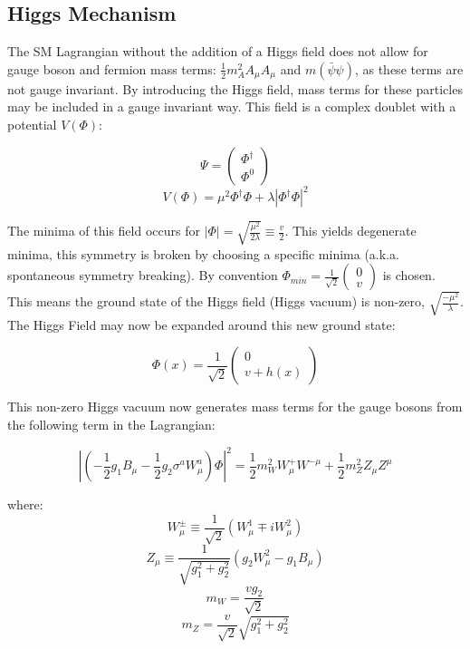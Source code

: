 \subsection{Higgs Mechanism}
The SM Lagrangian without the addition of a Higgs field does not allow for gauge boson and fermion mass terms: $\frac{1}{2}m_{A}^{2}A_{\mu}A_{\mu}$ and $m(\bar{\psi}\psi)$,  as these terms are not gauge invariant. By introducing the Higgs field, mass terms for these particles may be included in a gauge invariant way. This field is a complex doublet with a potential $V(\Phi)$:

\begin{equation}
\Psi = \begin{pmatrix} \Phi^{\dagger} \\ \Phi^{0} \end{pmatrix}
\end{equation}
\begin{equation}
V(\Phi)=\mu^{2}\Phi^{\dagger}\Phi + \lambda |\Phi^{\dagger}\Phi|^{2}
\end{equation}

The minima of this field occurs for $|\Phi|= \sqrt{\frac{\mu^{2}}{2\lambda}} \equiv \frac{v}{2}$. This yields degenerate minima, this symmetry is broken by choosing a specific minima (a.k.a. spontaneous symmetry breaking). By convention  $\Phi_{min} = \frac{1}{\sqrt{2}}\begin{pmatrix}0 \\ v \end{pmatrix}$ is chosen. This means the ground state of the Higgs field (Higgs vacuum) is non-zero, $\sqrt{\frac{-\mu^{2}}{\lambda}}$. The Higgs Field may now be expanded around this new ground state:

\begin{equation}
\Phi(x)=\frac{1}{\sqrt{2}}\begin{pmatrix} 0 \\ v+h(x)\end{pmatrix}
\end{equation}

This non-zero Higgs vacuum now generates mass terms for the gauge bosons from the following term in the Lagrangian:

\begin{equation}
|(-\frac{1}{2}g_{1}B_{\mu}-\frac{1}{2}g_{2}\sigma^{a}W_{\mu}^{a})\Phi|^{2}=\frac{1}{2}m_{W}^{2}W_{\mu}^{+}W^{-\mu}+\frac{1}{2}m_{Z}^{2}Z_{\mu}Z^{\mu}
\end{equation}

where:
\begin{equation}
W^{\pm}_{\mu} \equiv \frac{1}{\sqrt{2}}(W^{1}_{\mu} \mp iW^{2}_{\mu})
\end{equation}
\begin{equation}
Z_{\mu} \equiv \frac{1}{\sqrt{g_{1}^{2}+g_{2}^{2}}}(g_{2}W^{2}_{\mu}-g_{1}B_{\mu})
\end{equation}
\begin{equation}
m_{W} = \frac{vg_{2}}{\sqrt{2}}
\end{equation}
\begin{equation}
m_{Z} = \frac{v}{\sqrt{2}}\sqrt{g_{1}^{2} + g_{2}^{2}}
\end{equation}


